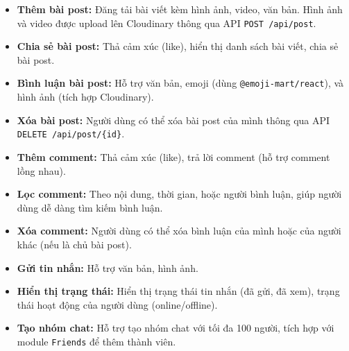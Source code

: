 

\vspace{0.5cm} %
\begin{itemize}
    \renewcommand{\labelitemi}{-} %
    \item \textbf{Thêm bài post:} Đăng tải bài viết kèm hình ảnh, video, văn bản. Hình ảnh và video được upload lên Cloudinary thông qua API \texttt{POST /api/post}.
    \item \textbf{Chia sẻ bài post:} Thả cảm xúc (like), hiển thị danh sách bài viết, chia sẻ bài post.
    \item \textbf{Bình luận bài post:} Hỗ trợ văn bản, emoji (dùng \texttt{@emoji-mart/react}), và hình ảnh (tích hợp Cloudinary).
    \item \textbf{Xóa bài post:} Người dùng có thể xóa bài post của mình thông qua API \texttt{DELETE /api/post/\{id\}}.
\end{itemize}

\vspace{0.3cm}
\begin{itemize}
    \renewcommand{\labelitemi}{-}
    \item \textbf{Thêm comment:} Thả cảm xúc (like), trả lời comment (hỗ trợ comment lồng nhau).
    \item \textbf{Lọc comment:} Theo nội dung, thời gian, hoặc người bình luận, giúp người dùng dễ dàng tìm kiếm bình luận.
    \item \textbf{Xóa comment:} Người dùng có thể xóa bình luận của mình hoặc của người khác (nếu là chủ bài post).
\end{itemize}

\vspace{0.3cm}
\begin{itemize}
    \renewcommand{\labelitemi}{-}
    \item \textbf{Gửi tin nhắn:} Hỗ trợ văn bản, hình ảnh.
    \item \textbf{Hiển thị trạng thái:} Hiển thị trạng thái tin nhắn (đã gửi, đã xem), trạng thái hoạt động của người dùng (online/offline).
    \item \textbf{Tạo nhóm chat:} Hỗ trợ tạo nhóm chat với tối đa 100 người, tích hợp với module \texttt{Friends} để thêm thành viên.
\end{itemize}

